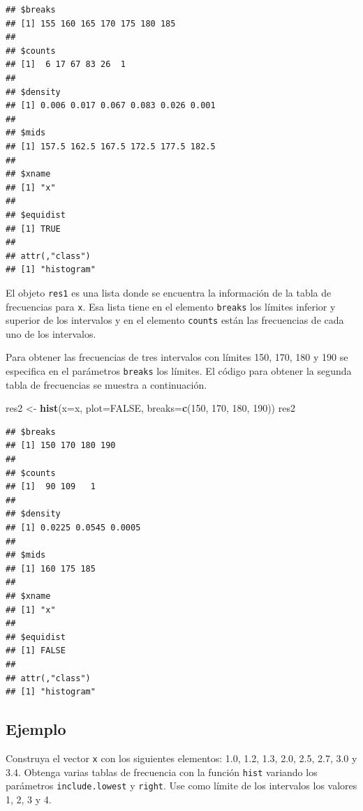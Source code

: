 \documentclass[10pt,]{krantz}
\makeatletter
\newenvironment{Shaded}{\begin{snugshade}}{\end{snugshade}}
\newcommand{\KeywordTok}[1]{\textcolor[rgb]{0.13,0.29,0.53}{\textbf{{#1}}}}
\newcommand{\DataTypeTok}[1]{\textcolor[rgb]{0.13,0.29,0.53}{{#1}}}
\newcommand{\DecValTok}[1]{\textcolor[rgb]{0.00,0.00,0.81}{{#1}}}
\newcommand{\StringTok}[1]{\textcolor[rgb]{0.31,0.60,0.02}{{#1}}}
\newcommand{\OtherTok}[1]{\textcolor[rgb]{0.56,0.35,0.01}{{#1}}}
\newcommand{\NormalTok}[1]{{#1}}
\newenvironment{kframe}{%
\medskip{}
\setlength{\fboxsep}{.8em}
 \def\at@end@of@kframe{}%
 \ifinner\ifhmode%
  \def\at@end@of@kframe{\end{minipage}}%
  \begin{minipage}{\columnwidth}%
 \fi\fi%
 \def\FrameCommand##1{\hskip\@totalleftmargin \hskip-\fboxsep
 \colorbox{shadecolor}{##1}\hskip-\fboxsep
     \hskip-\linewidth \hskip-\@totalleftmargin \hskip\columnwidth}%
 \MakeFramed {\advance\hsize-\width
   \@totalleftmargin\z@ \linewidth\hsize
   \@setminipage}}%
 {\par\unskip\endMakeFramed%
 \at@end@of@kframe}
\renewenvironment{Shaded}{\begin{kframe}}{\end{kframe}}
\makeatother
\begin{document}
\begin{verbatim}
## $breaks
## [1] 155 160 165 170 175 180 185
## 
## $counts
## [1]  6 17 67 83 26  1
## 
## $density
## [1] 0.006 0.017 0.067 0.083 0.026 0.001
## 
## $mids
## [1] 157.5 162.5 167.5 172.5 177.5 182.5
## 
## $xname
## [1] "x"
## 
## $equidist
## [1] TRUE
## 
## attr(,"class")
## [1] "histogram"
\end{verbatim}

El objeto \texttt{res1} es una lista donde se encuentra la información
de la tabla de frecuencias para \texttt{x}. Esa lista tiene en el
elemento \texttt{breaks} los límites inferior y superior de los
intervalos y en el elemento \texttt{counts} están las frecuencias de
cada uno de los intervalos.

Para obtener las frecuencias de tres intervalos con límites 150, 170,
180 y 190 se especifica en el parámetros \texttt{breaks} los límites. El
código para obtener la segunda tabla de frecuencias se muestra a
continuación.

\begin{Shaded}
\begin{Highlighting}[]
\NormalTok{res2 <-}\StringTok{ }\KeywordTok{hist}\NormalTok{(}\DataTypeTok{x=}\NormalTok{x, }\DataTypeTok{plot=}\OtherTok{FALSE}\NormalTok{, }
             \DataTypeTok{breaks=}\KeywordTok{c}\NormalTok{(}\DecValTok{150}\NormalTok{, }\DecValTok{170}\NormalTok{, }\DecValTok{180}\NormalTok{, }\DecValTok{190}\NormalTok{))}
\NormalTok{res2}
\end{Highlighting}
\end{Shaded}

\begin{verbatim}
## $breaks
## [1] 150 170 180 190
## 
## $counts
## [1]  90 109   1
## 
## $density
## [1] 0.0225 0.0545 0.0005
## 
## $mids
## [1] 160 175 185
## 
## $xname
## [1] "x"
## 
## $equidist
## [1] FALSE
## 
## attr(,"class")
## [1] "histogram"
\end{verbatim}

\subsection*{Ejemplo}\label{ejemplo-24}


Construya el vector \texttt{x} con los siguientes elementos: 1.0, 1.2,
1.3, 2.0, 2.5, 2.7, 3.0 y 3.4. Obtenga varias tablas de frecuencia con
la función \texttt{hist} variando los parámetros \texttt{include.lowest}
y \texttt{right}. Use como límite de los intervalos los valores 1, 2, 3
y 4.
\end{document}
